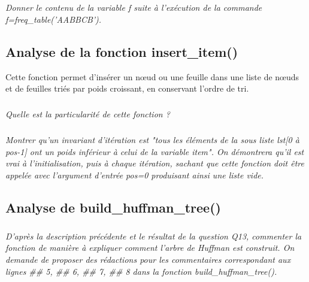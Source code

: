 \documentclass[10pt]{article}
\newif\ifprof
\begin{document}
\else
\fi


\subparagraph{}
\textit{Donner le contenu de la variable \textsf{f} suite à l'exécution de la commande
\textsf{f=freq\_table('AABBCB')}.}
\ifprof
\begin{corrige}
\textsf{f} contient \textsf{\{'A': 2, 'C': 1, 'B': 3\}}.
\end{corrige}

\else
\fi

\subsection{Analyse de la fonction \textsf{insert\_item()}}
Cette fonction permet d'insérer un n\oe{}ud ou une feuille dans une liste de n\oe{}uds et de feuilles triés par poids croissant, en conservant l'ordre de tri.


\subparagraph{}
\textit{Quelle est la particularité de cette fonction ?}
\ifprof
\begin{corrige}
La fonction proposée est récursive .
\end{corrige}

\else
\fi



\subparagraph{}
\textit{Montrer qu'un invariant d'itération est "tous les éléments de la sous liste \textsf{lst[0 à pos-1]} ont un poids inférieur à celui de la variable item". On démontrera qu'il est vrai à l'initialisation, puis à chaque itération, sachant que cette fonction doit être appelée avec l'argument d'entrée \textsf{pos=0} produisant ainsi une liste vide.}
\ifprof
\begin{corrige}

\end{corrige}

\else
\fi

\subsection{Analyse de \textsf{build\_huffman\_tree()}}


\subparagraph{}
\textit{D'après la description précédente et le résultat de la question Q13, commenter la fonction
de manière à expliquer comment l'arbre de Huffman est construit. On demande de proposer des
rédactions pour les commentaires correspondant aux lignes \#\# 5, \#\# 6, \#\# 7, \#\# 8 dans la fonction \textsf{build\_huffman\_tree()}.}
\ifprof
\begin{corrige}

\end{corrige}
\end{document}
